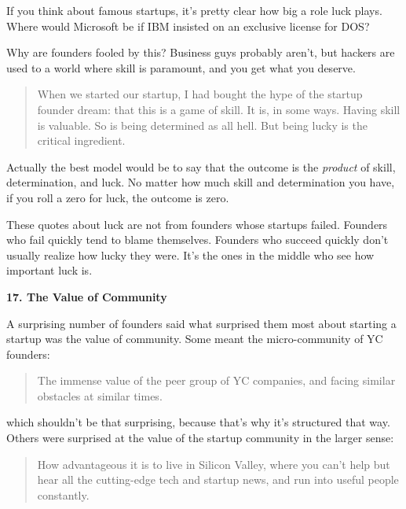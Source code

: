                   If you think about famous startups, it's pretty clear how big
                  a role luck plays. Where would Microsoft be if IBM insisted on
                  an exclusive license for DOS?

Why are founders
                  fooled by this? Business guys probably aren't, but hackers are
                  used to a world where skill is paramount, and you get what you
                  deserve.
                  \begin{quote}

                    When we started our startup, I had bought the hype of the
                    startup founder dream: that this is a game of skill. It is,
                    in some ways. Having skill is valuable. So is being
                    determined as all hell. But being lucky is the critical
                    ingredient.
                  
\end{quote}

                  Actually the best model would be to say that the outcome is
                  the
                  \emph{product} of skill, determination, and luck. No matter
                  how much skill and determination you have, if you roll a zero
                  for luck, the outcome is zero.

These quotes about
                  luck are not from founders whose startups failed. Founders who
                  fail quickly tend to blame themselves. Founders who succeed
                  quickly don't usually realize how lucky they were. It's the
                  ones in the middle who see how important luck is.


                  \textbf{17. The Value of Community}

A surprising
                  number of founders said what surprised them most about
                  starting a startup was the value of community. Some meant the
                  micro-community of YC founders:
                  \begin{quote}

                    The immense value of the peer group of YC companies, and
                    facing similar obstacles at similar times.
                  
\end{quote}

                  which shouldn't be that surprising, because that's why it's
                  structured that way. Others were surprised at the value of the
                  startup community in the larger sense:
                  \begin{quote}

                    How advantageous it is to live in Silicon Valley, where you
                    can't help but hear all the cutting-edge tech and startup
                    news, and run into useful people constantly.
                  
\end{quote}

